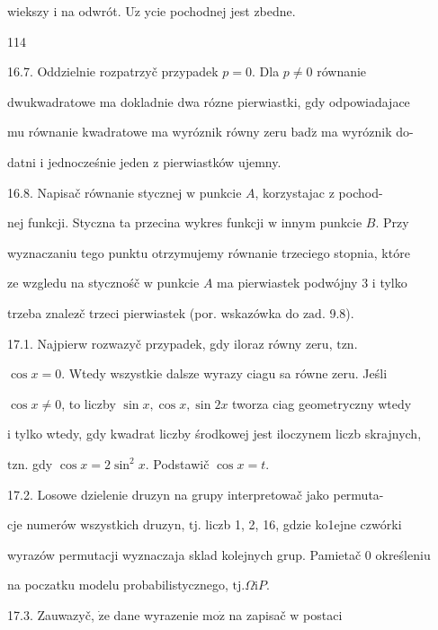 \documentclass[a4paper,12pt]{article}
\begin{document}
wiekszy $\mathrm{i}$ na odwrót. $\mathrm{U}\dot{\mathrm{z}}$ ycie pochodnej jest zbedne.





114

16.7. Oddzielnie rozpatrzyč przypadek $p = 0$. Dla $p \neq 0$ równanie

dwukwadratowe ma dokladnie dwa rózne pierwiastki, gdy odpowiadajace

mu równanie kwadratowe ma wyróznik równy zeru $\mathrm{b}\mathrm{a}\mathrm{d}\acute{\mathrm{z}}$ ma wyróznik do-

datni $\mathrm{i}$ jednocześnie jeden $\mathrm{z}$ pierwiastków ujemny.

16.8. Napisač równanie stycznej $\mathrm{w}$ punkcie $A$, korzystajac $\mathrm{z}$ pochod-

nej funkcji. Styczna ta przecina wykres funkcji $\mathrm{w}$ innym punkcie $B$. Przy

wyznaczaniu tego punktu otrzymujemy równanie trzeciego stopnia, które

ze wzgledu na stycznośč $\mathrm{w}$ punkcie $A$ ma pierwiastek podwójny 3 $\mathrm{i}$ tylko

trzeba znalez$\acute{}$č trzeci pierwiastek (por. wskazówka do $\mathrm{z}\mathrm{a}\mathrm{d}$. 9.8).

17.1. Najpierw rozwazyč przypadek, gdy iloraz równy zeru, $\mathrm{t}\mathrm{z}\mathrm{n}.$

$\cos x = 0$. Wtedy wszystkie dalsze wyrazy ciagu sa równe zeru. Jeśli

$\cos x \neq 0$, to liczby $\sin x, \cos x, \sin 2x$ tworza ciag geometryczny wtedy

$\mathrm{i}$ tylko wtedy, gdy kwadrat liczby środkowej jest iloczynem liczb skrajnych,

$\mathrm{t}\mathrm{z}\mathrm{n}$. gdy $\cos x=2\sin^{2}x$. Podstawič $\cos x=t.$

17.2. Losowe dzielenie druzyn na grupy interpretowač jako permuta-

cje numerów wszystkich druzyn, $\mathrm{t}\mathrm{j}$. liczb 1, 2, 16, gdzie ko1ejne czwórki

wyrazów permutacji wyznaczaja sklad kolejnych grup. Pamietač $0$ określeniu

na poczatku modelu probabilistycznego, $\mathrm{t}\mathrm{j}. \Omega \mathrm{i}P.$

17.3. Zauwazyč, $\dot{\mathrm{z}}\mathrm{e}$ dane wyrazenie $\mathrm{m}\mathrm{o}\dot{\mathrm{z}}$ na zapisač $\mathrm{w}$ postaci
\end{document}
